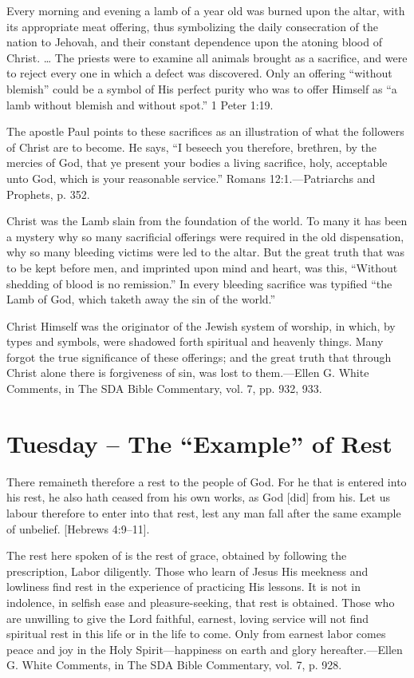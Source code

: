 \documentclass[a4paper, 10pt, twoside, headings=small]{scrartcl}
\begin{document}
\begin{multicols}{2}
Every morning and evening a lamb of a year old was burned upon the altar, with its appropriate meat offering, thus symbolizing the daily consecration of the nation to Jehovah, and their constant dependence upon the atoning blood of Christ. … The priests were to examine all animals brought as a sacrifice, and were to reject every one in which a defect was discovered. Only an offering “without blemish” could be a symbol of His perfect purity who was to offer Himself as “a lamb without blemish and without spot.” 1 Peter 1:19.

The apostle Paul points to these sacrifices as an illustration of what the followers of Christ are to become. He says, “I beseech you therefore, brethren, by the mercies of God, that ye present your bodies a living sacrifice, holy, acceptable unto God, which is your reasonable service.” Romans 12:1.—Patriarchs and Prophets, p. 352.

Christ was the Lamb slain from the foundation of the world. To many it has been a mystery why so many sacrificial offerings were required in the old dispensation, why so many bleeding victims were led to the altar. But the great truth that was to be kept before men, and imprinted upon mind and heart, was this, “Without shedding of blood is no remission.” In every bleeding sacrifice was typified “the Lamb of God, which taketh away the sin of the world.”

Christ Himself was the originator of the Jewish system of worship, in which, by types and symbols, were shadowed forth spiritual and heavenly things. Many forgot the true significance of these offerings; and the great truth that through Christ alone there is forgiveness of sin, was lost to them.—Ellen G. White Comments, in The SDA Bible Commentary, vol. 7, pp. 932, 933.

\section*{Tuesday – The “Example” of Rest}

There remaineth therefore a rest to the people of God. For he that is entered into his rest, he also hath ceased from his own works, as God [did] from his. Let us labour therefore to enter into that rest, lest any man fall after the same example of unbelief. [Hebrews 4:9–11].

The rest here spoken of is the rest of grace, obtained by following the prescription, Labor diligently. Those who learn of Jesus His meekness and lowliness find rest in the experience of practicing His lessons. It is not in indolence, in selfish ease and pleasure-seeking, that rest is obtained. Those who are unwilling to give the Lord faithful, earnest, loving service will not find spiritual rest in this life or in the life to come. Only from earnest labor comes peace and joy in the Holy Spirit—happiness on earth and glory hereafter.—Ellen G. White Comments, in The SDA Bible Commentary, vol. 7, p. 928.


\end{multicols}
\end{document}
